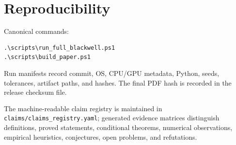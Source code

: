 \section{Reproducibility}

Canonical commands:

\begin{verbatim}
.\scripts\run_full_blackwell.ps1
.\scripts\build_paper.ps1
\end{verbatim}

Run manifests record commit, OS, CPU/GPU metadata, Python, seeds, tolerances, artifact paths, and hashes. The final PDF hash is recorded in the release checksum file.

The machine-readable claim registry is maintained in 
\texttt{claims/claims\_registry.yaml}; generated evidence matrices distinguish definitions, proved statements, conditional theorems, numerical observations, empirical heuristics, conjectures, open problems, and refutations.
